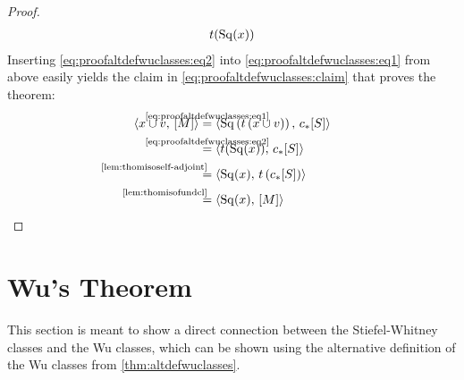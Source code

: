 \begin{Thm}
\begin{proof}
\begin{align}
        t(\mathrm{Sq}(x))
    \end{align}
    Inserting \eqref{eq:proofaltdefwuclasses:eq2} into
    \eqref{eq:proofaltdefwuclasses:eq1} from above easily yields the
    claim in \eqref{eq:proofaltdefwuclasses:claim} that proves the theorem:
    \begin{align*}
      \capped{x\cup \vu}{\fundcl M}
      &\cequalsby{\eqref{eq:proofaltdefwuclasses:eq1}}
        \capped
        {\SQ\left(\thomiso\left(x\cup\vu\right)\right)}
        {\pf\collapse\fundcl{\Sph}}
      \\
      &\cequalsby{\eqref{eq:proofaltdefwuclasses:eq2}}
        \capped
        {\thomiso(\SQ(x))}
        {\pf\collapse\fundcl{\Sph}}
      \\
      &\equalsby{\autoref{lem:thomisoself-adjoint}}
        \capped
        {\SQ(x)}
        {\thomiso\left(\pf\collapse\fundcl{\Sph}\right)}
      \\
      &\equalsby{\autoref{lem:thomisofundcl}}
        \capped
        {\SQ(x)}
        {\fundcl M}
        \qedhere
    \end{align*}
  \end{proof}
\end{Thm}


\section[Wu's Theorem]{Wu's Theorem}\label{sec:wutheorem}
This section is meant to show a direct connection between the
Stiefel-Whitney classes and the Wu classes, which can be shown using
the alternative definition of the Wu classes from
\autoref{thm:altdefwuclasses}.

